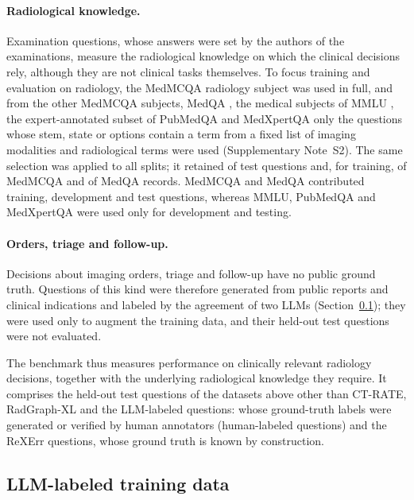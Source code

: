 \documentclass[11pt]{article}
\begin{document}
\paragraph{Radiological knowledge.} Examination questions, whose answers were set by the authors of the examinations, measure the radiological knowledge on which the clinical decisions rely, although they are not clinical tasks themselves. To focus training and evaluation on radiology, the MedMCQA \citep{pal2022medmcqa} radiology subject was used in full, and from the other MedMCQA subjects, MedQA \citep{jin2021medqa}, the medical subjects of MMLU \citep{hendrycks2021mmlu}, the expert-annotated subset of PubMedQA \citep{jin2019pubmedqa} and MedXpertQA \citep{zuo2025medxpertqa} only the questions whose stem, state or options contain a term from a fixed list of imaging modalities and radiological terms were used (Supplementary Note~S2). The same selection was applied to all splits; it retained  of  test questions and, for training,  of  MedMCQA and  of  MedQA records. MedMCQA and MedQA contributed training, development and test questions, whereas MMLU, PubMedQA and MedXpertQA were used only for development and testing.

\paragraph{Orders, triage and follow-up.} Decisions about imaging orders, triage and follow-up have no public ground truth. Questions of this kind were therefore generated from public reports and clinical indications and labeled by the agreement of two LLMs (Section~\ref{sec:llmlabels}); they were used only to augment the training data, and their held-out test questions were not evaluated.

The benchmark thus measures performance on clinically relevant radiology decisions, together with the underlying radiological knowledge they require. It comprises the  held-out test questions of the datasets above other than CT-RATE, RadGraph-XL and the LLM-labeled questions:  whose ground-truth labels were generated or verified by human annotators (human-labeled questions) and the  ReXErr questions, whose ground truth is known by construction.


\FloatBarrier
\subsection{LLM-labeled training data}\label{sec:llmlabels}
\end{document}
